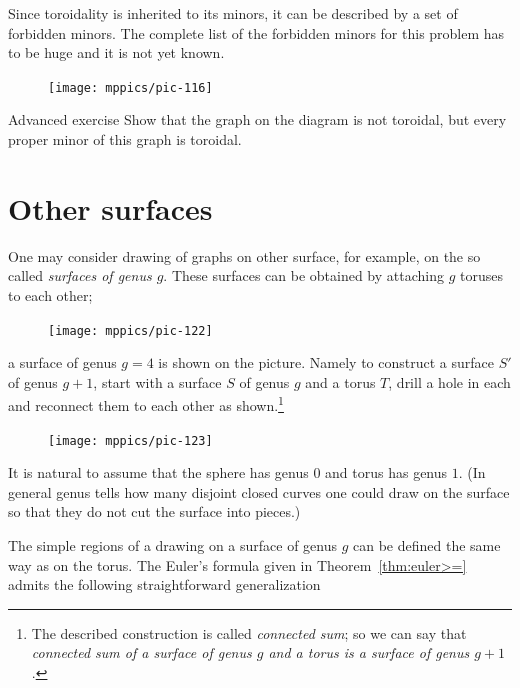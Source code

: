Since toroidality is inherited to its minors, it can be described by a set of forbidden minors.
The complete list of the forbidden minors for this problem has to be huge and it is not yet known.

{

\begin{figure}
\vskip-7mm
\centering
\texttt{[image: mppics/pic-116]}
\vskip0mm
\end{figure}

\begin{thm}{Advanced exercise}
Show that the graph on the diagram is not toroidal,
but every proper minor of this graph is toroidal.
\end{thm}

}

\section*{Other surfaces}

One may consider drawing of graphs on other surface,
for example, on the so called \emph{surfaces of genus $g$}.
These surfaces can be obtained by attaching $g$ toruses to each other; 
\begin{figure}[h!]%
\vskip-0mm
\centering
\texttt{[image: mppics/pic-122]}
\vskip-0mm
\end{figure}
a surface of genus $g=4$ is shown on the picture.
Namely to construct a surface $S'$ of genus $g+1$, start with a surface $S$ of genus $g$ and a torus $T$, drill a hole in each and reconnect them to each other as shown.\footnote{The described construction is called \emph{connected sum}; so we can say that {}\emph{connected sum of a surface of genus $g$ and a torus is a surface of genus $g+1$}.}
\begin{figure}[h!]%
\vskip-0mm
\centering
\texttt{[image: mppics/pic-123]}
\vskip-0mm
\end{figure}


It is natural to assume that the sphere has genus $0$ and torus has genus $1$.
(In general genus tells how many disjoint closed curves one could draw on the surface so that they do not cut the surface into pieces.)

The simple regions of a drawing on a surface of genus $g$ can be defined the same way as on the torus.
The Euler's formula given in Theorem~\ref{thm:euler>=} admits the following straightforward generalization

